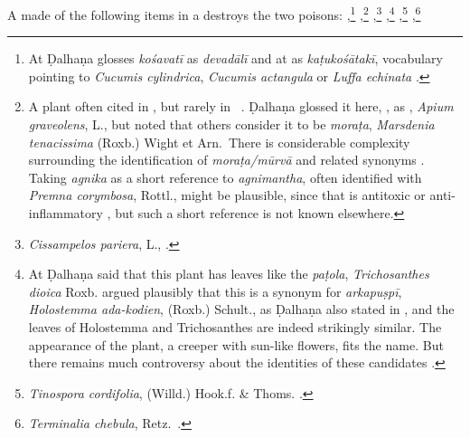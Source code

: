 \begin{translation}
        A  made of the following items in a
 destroys the two poisons:
,\footnote{At  Ḍalhaṇa glosses
\emph{kośavatī} as \emph{devadālī} and at  as
\emph{kaṭukośātakī}, vocabulary pointing to \emph{Cucumis cylindrica},
\emph{Cucumis actangula} or \emph{Luffa echinata} \parencites[207,
121]{sing-1972}[252--253]{adps}.} %
,\footnote{A plant often cited in \SS, but rarely in \CS\
\citep[4]{sing-1972}.  Ḍalhaṇa glossed it here, , as
\se{ajamodā}{wild celery}, \emph{Apium graveolens}, L., but noted that others
consider it to be \emph{moraṭa}, \emph{Marsdenia tenacissima} (Roxb.) Wight et
Arn.\ There is considerable complexity surrounding the identification of
\emph{moraṭa/mūrvā} and related synonyms \citep[314-316]{sing-1972}.  Taking
\emph{agnika} as a short reference to \emph{agnimantha}, often identified  with
\emph{Premna corymbosa}, Rottl., might be plausible, since that is antitoxic or
anti-inflammatory \parencites[21]{adps}[\#2025]{nadk-1954}[4, 348]{avs}, but such
a short reference is not known elsewhere.} %
%
,\footnote{\emph{Cissampelos pariera}, L.,
\cites[366]{adps}[\#592]{nadk-1954}[243--244]{sing-1972}[2.277]{avs}.} %
%
,\footnote{At  Ḍalhaṇa said that
this plant has leaves like the \emph{paṭola}, \emph{Trichosanthes dioica} Roxb. \citet[280,
443]{sing-1972} argued plausibly that this is a synonym for \emph{arkapuṣpī},
\emph{Holostemma ada-kodien}, (Roxb.) Schult., as Ḍalhaṇa also stated in
\Su{1.45.120}{206}, and the leaves of Holostemma and Trichosanthes are indeed strikingly 
similar.  The appearance of the plant, a creeper with sun-like
flowers, fits the name.  But there remains much controversy about the
identities of these candidates \citep[e.g.,][195--198]{adps}.} %
%
,\footnote{\emph{Tinospora cordifolia}, (Willd.)
Hook.f. \& Thoms. \parencites[141--143]{sing-1972}[38--40]{adps}\cite[\#2472 and
\#624]{nadk-1954}.} %
%
,\footnote{\emph{Terminalia chebula}, Retz.\
\parencites[172]{adps}[\#2451]{nadk-1954}[15]{sing-1972}.} %

\end{translation}
